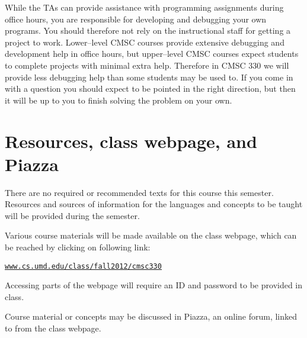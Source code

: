 \documentclass[10pt]{article}
\begin{document}
      \enlargethispage{5mm}

      While the TAs can provide assistance with programming assignments during
    office hours, you are responsible for developing and debugging your own
    programs.  You should therefore not rely on the instructional staff for
    getting a project to work.  Lower--level CMSC courses provide extensive
    debugging and development help in office hours, but upper--level CMSC
    courses expect students to complete projects with minimal extra help.
    Therefore in CMSC 330 we will provide less debugging help than some
    students may be used to.  If you come in with a question you should
    expect to be pointed in the right direction, but then it will be up to
    you to finish solving the problem on your own.

  \section{Resources, class webpage, and Piazza}

    There are no required or recommended texts for this course this semester.
  Resources and sources of information for the languages and concepts to be
  taught will be provided during the semester.

    Various course materials will be made available on the class webpage,
  which can be reached by clicking on following link:

    \vspace{-3mm}

    \begin{centering}

    \href{http://www.cs.umd.edu/class/fall2012/cmsc330}
         {\texttt{\underline{www.cs.umd.edu/class/fall2012/cmsc330}}}

    \end{centering}

    \medskip

    Accessing parts of the webpage will require an ID and password to be
  provided in class.

    Course material or concepts may be discussed in Piazza, an online forum,
  linked to from the class webpage.
\end{document}
